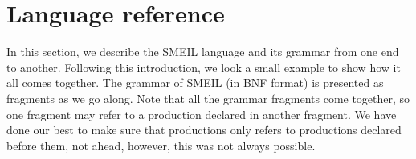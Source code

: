  




\section{Language reference}
In this section, we describe the SMEIL language and its grammar from one end to
another. Following this introduction, we look a small example to show how it all
comes together. The grammar of SMEIL (in BNF format) is presented as fragments
as we go along. Note that all the grammar fragments come together, so one
fragment may refer to a production declared in another fragment. We have done
our best to make sure that productions only refers to productions declared
before them, not ahead, however, this was not always possible.




